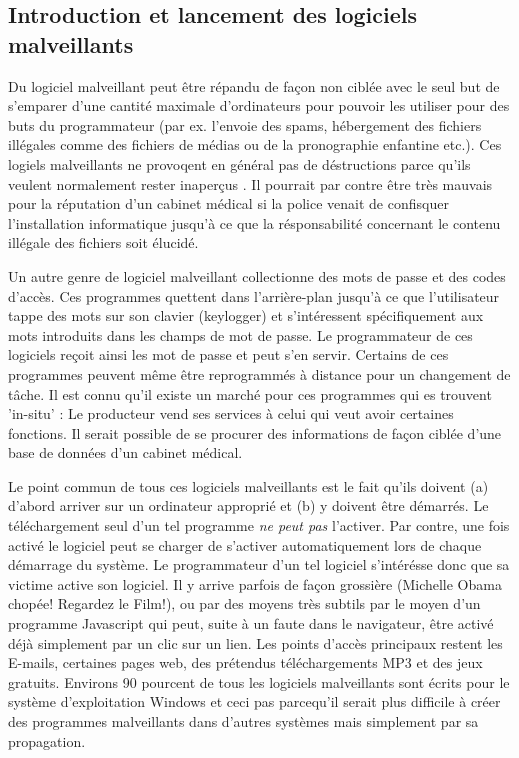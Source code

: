 \documentclass[a4paper]{scrartcl}
\begin{document}
\subsection{Introduction et lancement des logiciels malveillants}
Du logiciel malveillant peut être répandu de façon non ciblée avec le seul but de s'emparer d'une cantité maximale d'ordinateurs pour pouvoir les utiliser pour des buts du programmateur (par ex. l'envoie des spams, hébergement des fichiers illégales comme des fichiers de médias ou de la pronographie enfantine etc.). Ces logiels malveillants ne provoqent en général pas de déstructions parce qu'ils veulent normalement rester inaperçus . Il pourrait par contre être très mauvais pour la réputation d'un cabinet médical si la police venait de confisquer l'installation informatique jusqu'à ce que la résponsabilité concernant le contenu illégale des fichiers soit élucidé.

\medskip

Un autre genre de logiciel malveillant collectionne des mots de passe et des codes d'accès. Ces programmes quettent dans l'arrière-plan jusqu'à ce que l'utilisateur tappe des mots sur son clavier (keylogger) et s'intéressent spécifiquement aux mots introduits dans les champs de mot de passe. Le programmateur de ces logiciels reçoit ainsi les mot de passe et peut s'en servir. Certains de ces programmes peuvent même être reprogrammés à distance pour un changement de tâche. Il est connu qu'il existe un marché pour ces programmes qui es trouvent 'in-situ' : Le producteur vend ses services à celui qui veut avoir certaines fonctions. Il serait possible de se procurer des informations de façon ciblée d'une base de données d'un cabinet médical.

\medskip

Le point commun de tous ces logiciels malveillants est le fait qu'ils doivent (a) d'abord arriver sur un ordinateur approprié et (b) y doivent être démarrés. Le téléchargement seul d'un tel programme \textit{ne peut pas } l'activer. Par contre, une fois activé le logiciel peut se charger de s'activer automatiquement lors de chaque démarrage du système. Le programmateur d'un tel logiciel s'intérésse donc que sa victime active son logiciel. Il y arrive parfois de façon grossière (\glqq Michelle Obama chopée! Regardez le Film!\grqq{}), ou par des moyens très subtils par le moyen d'un programme Javascript qui peut, suite à un faute dans le navigateur, être activé déjà simplement par un clic sur un lien. Les points d'accès principaux restent les E-mails, certaines pages web, des prétendus téléchargements MP3 et des jeux gratuits. Environs 90 pourcent de tous les logiciels malveillants sont écrits pour le système d'exploitation Windows et ceci pas parcequ'il serait plus difficile à créer des programmes malveillants dans d'autres systèmes mais simplement par sa propagation.
\end{document}
